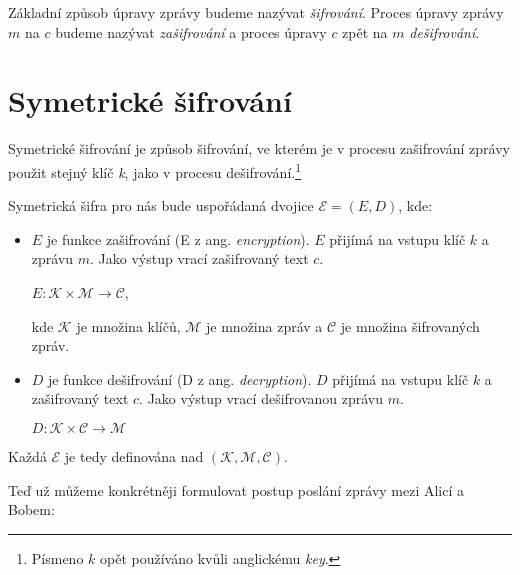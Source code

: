 \documentclass[
  program=infoi,
  biblatex,
  figures=false,
  glossaries,
  index
]{kidiplom}
\begin{document}
    Základní způsob úpravy zprávy budeme nazývat \emph{šifrování}. Proces úpravy zprávy $m$ na $c$
    budeme nazývat \emph{zašifrování} a proces úpravy $c$ zpět na $m$ \emph{dešifrování}.

\newpage
\part{Symetrické šifrování}\label{private-key}
    Symetrické šifrování je způsob šifrování, ve kterém je v procesu zašifrování zprávy použit
    stejný klíč \emph{k}, jako v procesu dešifrování.\footnote{Písmeno $k$ opět používáno kvůli anglickému \emph{key}.}


    \bigskip

    Symetrická šifra pro nás bude uspořádaná dvojice $\mathcal{E}  = (E, D)$, kde:

    \begin{itemize}
        \item
            $E$ je funkce zašifrování (E z ang. \emph{encryption}).
            $E$ přijímá na vstupu klíč $k$ a zprávu $m$.
            Jako výstup vrací zašifrovaný text $c$.

            \begin{center}
                $E: \mathcal{K} \times \mathcal{M} \rightarrow \mathcal{C}$,
            \end{center}

            kde $\mathcal{K}$ je množina klíčů, $\mathcal{M}$ je množina zpráv a 
            $\mathcal{C}$ je množina šifrovaných zpráv.

        \item
            $D$ je funkce dešifrování (D z ang. \emph{decryption}). $D$ přijímá na vstupu klíč $k$ a zašifrovaný text $c$.
            Jako výstup vrací dešifrovanou zprávu $m$.
            
            \begin{center}
                $D: \mathcal{K} \times \mathcal{C} \rightarrow \mathcal{M}$
            \end{center}

    \end{itemize}

    Každá $\mathcal{E}$ je tedy definována nad $(\mathcal{K},\mathcal{M},\mathcal{C})$.

    \medskip

    Teď už můžeme konkrétněji formulovat postup poslání zprávy mezi Alicí a Bobem:
\end{document}
